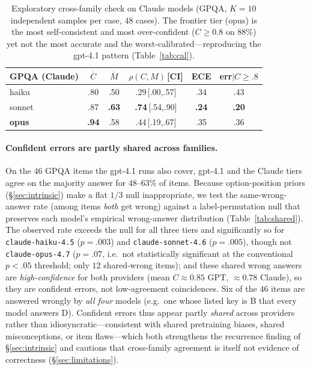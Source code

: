 \documentclass[11pt]{article}
\newcommand{\C}{\textit{C}}
\newcommand{\Mlab}{\textit{M}}
\begin{document}
\begin{table}[t]
\centering\footnotesize
\setlength{\tabcolsep}{3pt}
\begin{tabular}{@{}lccccc@{}}
\toprule
GPQA (Claude) & $\overline{\C}$ & $\overline{\Mlab}$ & $\rho(\C,\Mlab)$\,[CI] & ECE & err$\mid\C{\geq}.8$ \\
\midrule
haiku           & .80 & .50 & .29\,[.00,.57] & .34 & .43 \\
sonnet          & .87 & \textbf{.63} & \textbf{.74}\,[.54,.90] & \textbf{.24} & \textbf{.20} \\
\textbf{opus}   & \textbf{.94} & .58 & .44\,[.19,.67] & .35 & .36 \\
\bottomrule
\end{tabular}
\caption{Exploratory cross-family check on Claude models (GPQA, $K{=}10$ independent samples per
case, $48$ cases). The frontier tier (opus) is the most self-consistent and most over-confident
($\C\geq0.8$ on $88\%$) yet not the most accurate and the worst-calibrated---reproducing the gpt-4.1
pattern (Table~\ref{tab:cal}).}
\label{tab:crossfamily}
\end{table}

\paragraph{Confident errors are partly shared across families.} On the $46$ GPQA items the gpt-4.1 runs
also cover, gpt-4.1 and the Claude tiers agree on the majority answer for $48$--$63\%$ of items. Because
option-position priors (\S\ref{sec:intrinsic}) make a flat $1/3$ null inappropriate, we test the
same-wrong-answer rate (among items \emph{both} get wrong) against a label-permutation null that preserves
each model's empirical wrong-answer distribution (Table~\ref{tab:shared}). The observed rate exceeds the
null for all three tiers and significantly so for \texttt{claude-haiku-4.5} ($p{=}.003$) and
\texttt{claude-sonnet-4.6} ($p{=}.005$), though not \texttt{claude-opus-4.7} ($p{=}.07$, i.e.\ not
statistically significant at the conventional $p<.05$ threshold; only $12$ shared-wrong items); and these shared wrong answers are \emph{high-confidence}
for both providers (mean $\C\approx0.85$ GPT, $\approx0.78$ Claude), so they are confident errors, not
low-agreement coincidences. Six of the $46$ items are answered wrongly by \emph{all four} models (e.g.\
one whose listed key is B that every model answers D). Confident errors thus appear partly \emph{shared}
across providers rather than idiosyncratic---consistent with shared pretraining biases, shared
misconceptions, or item flaws---which both strengthens the recurrence finding of \S\ref{sec:intrinsic} and
cautions that cross-family agreement is itself not evidence of correctness (\S\ref{sec:limitations}).
\end{document}
